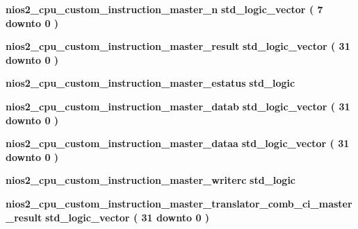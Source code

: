 \begin{DoxyCompactItemize}
\item 
{\bf nios2\+\_\+cpu\+\_\+custom\+\_\+instruction\+\_\+master\+\_\+n} {\bfseries \textcolor{comment}{std\+\_\+logic\+\_\+vector}\textcolor{vhdlchar}{ }\textcolor{vhdlchar}{(}\textcolor{vhdlchar}{ }\textcolor{vhdlchar}{ } \textcolor{vhdldigit}{7} \textcolor{vhdlchar}{ }\textcolor{keywordflow}{downto}\textcolor{vhdlchar}{ }\textcolor{vhdlchar}{ } \textcolor{vhdldigit}{0} \textcolor{vhdlchar}{ }\textcolor{vhdlchar}{)}\textcolor{vhdlchar}{ }} 
\item 
{\bf nios2\+\_\+cpu\+\_\+custom\+\_\+instruction\+\_\+master\+\_\+result} {\bfseries \textcolor{comment}{std\+\_\+logic\+\_\+vector}\textcolor{vhdlchar}{ }\textcolor{vhdlchar}{(}\textcolor{vhdlchar}{ }\textcolor{vhdlchar}{ } \textcolor{vhdldigit}{31} \textcolor{vhdlchar}{ }\textcolor{keywordflow}{downto}\textcolor{vhdlchar}{ }\textcolor{vhdlchar}{ } \textcolor{vhdldigit}{0} \textcolor{vhdlchar}{ }\textcolor{vhdlchar}{)}\textcolor{vhdlchar}{ }} 
\item 
{\bf nios2\+\_\+cpu\+\_\+custom\+\_\+instruction\+\_\+master\+\_\+estatus} {\bfseries \textcolor{comment}{std\+\_\+logic}\textcolor{vhdlchar}{ }} 
\item 
{\bf nios2\+\_\+cpu\+\_\+custom\+\_\+instruction\+\_\+master\+\_\+datab} {\bfseries \textcolor{comment}{std\+\_\+logic\+\_\+vector}\textcolor{vhdlchar}{ }\textcolor{vhdlchar}{(}\textcolor{vhdlchar}{ }\textcolor{vhdlchar}{ } \textcolor{vhdldigit}{31} \textcolor{vhdlchar}{ }\textcolor{keywordflow}{downto}\textcolor{vhdlchar}{ }\textcolor{vhdlchar}{ } \textcolor{vhdldigit}{0} \textcolor{vhdlchar}{ }\textcolor{vhdlchar}{)}\textcolor{vhdlchar}{ }} 
\item 
{\bf nios2\+\_\+cpu\+\_\+custom\+\_\+instruction\+\_\+master\+\_\+dataa} {\bfseries \textcolor{comment}{std\+\_\+logic\+\_\+vector}\textcolor{vhdlchar}{ }\textcolor{vhdlchar}{(}\textcolor{vhdlchar}{ }\textcolor{vhdlchar}{ } \textcolor{vhdldigit}{31} \textcolor{vhdlchar}{ }\textcolor{keywordflow}{downto}\textcolor{vhdlchar}{ }\textcolor{vhdlchar}{ } \textcolor{vhdldigit}{0} \textcolor{vhdlchar}{ }\textcolor{vhdlchar}{)}\textcolor{vhdlchar}{ }} 
\item 
{\bf nios2\+\_\+cpu\+\_\+custom\+\_\+instruction\+\_\+master\+\_\+writerc} {\bfseries \textcolor{comment}{std\+\_\+logic}\textcolor{vhdlchar}{ }} 
\item 
{\bf nios2\+\_\+cpu\+\_\+custom\+\_\+instruction\+\_\+master\+\_\+translator\+\_\+comb\+\_\+ci\+\_\+master\+\_\+result} {\bfseries \textcolor{comment}{std\+\_\+logic\+\_\+vector}\textcolor{vhdlchar}{ }\textcolor{vhdlchar}{(}\textcolor{vhdlchar}{ }\textcolor{vhdlchar}{ } \textcolor{vhdldigit}{31} \textcolor{vhdlchar}{ }\textcolor{keywordflow}{downto}\textcolor{vhdlchar}{ }\textcolor{vhdlchar}{ } \textcolor{vhdldigit}{0} \textcolor{vhdlchar}{ }\textcolor{vhdlchar}{)}\textcolor{vhdlchar}{ }} 

\end{DoxyCompactItemize}
